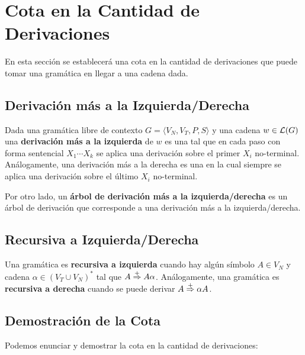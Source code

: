 \section{Cota en la Cantidad de Derivaciones}

En esta sección se establecerá una cota en la cantidad de derivaciones que puede tomar una gramática en llegar a una cadena dada.

\subsection{Derivación más a la Izquierda/Derecha}

Dada una gramática libre de contexto $G = \langle V_N, V_T, P, S \rangle$ y una cadena $w \in \mathcal{L}(G)$ una \textbf{derivación más a la izquierda} de $w$ es una tal que en cada paso con forma sentencial $X_1 \cdots X_k$ se aplica una derivación sobre el primer $X_i$ no-terminal. Análogamente, una derivación más a la derecha es una en la cual siempre se aplica una derivación sobre el último $X_i$ no-terminal.

Por otro lado, un \textbf{árbol de derivación más a la izquierda/derecha} es un árbol de derivación que corresponde a una derivación más a la izquierda/derecha.

\subsection{Recursiva a Izquierda/Derecha}
\label{recursiva-a-izquierda-cota}

Una gramática es \textbf{recursiva a izquierda} cuando hay algún símbolo $A \in V_N$ y cadena $\alpha \in (V_T \cup V_N)^*$ tal que $A \overset{+}{\Rightarrow} A \alpha$. Análogamente, una gramática es \textbf{recursiva a derecha} cuando se puede derivar $A \overset{+}{\Rightarrow} \alpha A$.

\subsection{Demostración de la Cota}

Podemos enunciar y demostrar la cota en la cantidad de derivaciones:

